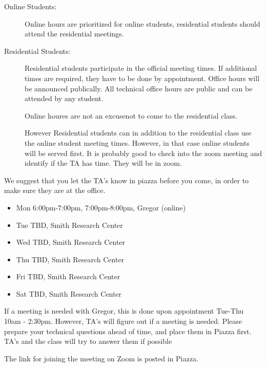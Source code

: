 \begin{description}

\item[Online Students:] Online hours are prioritized for online students,
  residential students should attend the residential meetings. 

\item[Residential Students:] Residential students participate in the
  official meeting times. If additional times are required, they have
  to be done by appointment. Office hours will be announced
  publically. All technical office hours are public and can be
  attended by any student.

  Online houres are not an excusenot to come to the residential class.

  However Residential students can in addition to the residential
  class use the online student meeting times.  However, in that case
  online students will be served first. It is probably good to check
  into the zoom meeting and identify if the TA has time. They will be
  in zoom.

\end{description}

We suggest that you let the TA's know in piazza before you come, in order to make
sure they are at the office.


\begin{itemize}
\item Mon 6:00pm-7:00pm, 7:00pm-8:00pm, Gregor (online)
\item Tue TBD, Smith Research Center
\item Wed TBD, Smith Research Center
\item Thu TBD, Smith Research Center
\item Fri TBD, Smith Research Center
\item Sat TBD, Smith Research Center
\end{itemize}


If a meeting is needed with Gregor, this is done upon appointment
Tue-Thu 10am - 2:30pm. However, TA's will figure out if a meeting is needed.
Please prepare your technical questions ahead of time, and place them in Piazza
first. TA's and the class will try to answer them if possible

The link for joining the meeting on Zoom is posted in Piazza.

